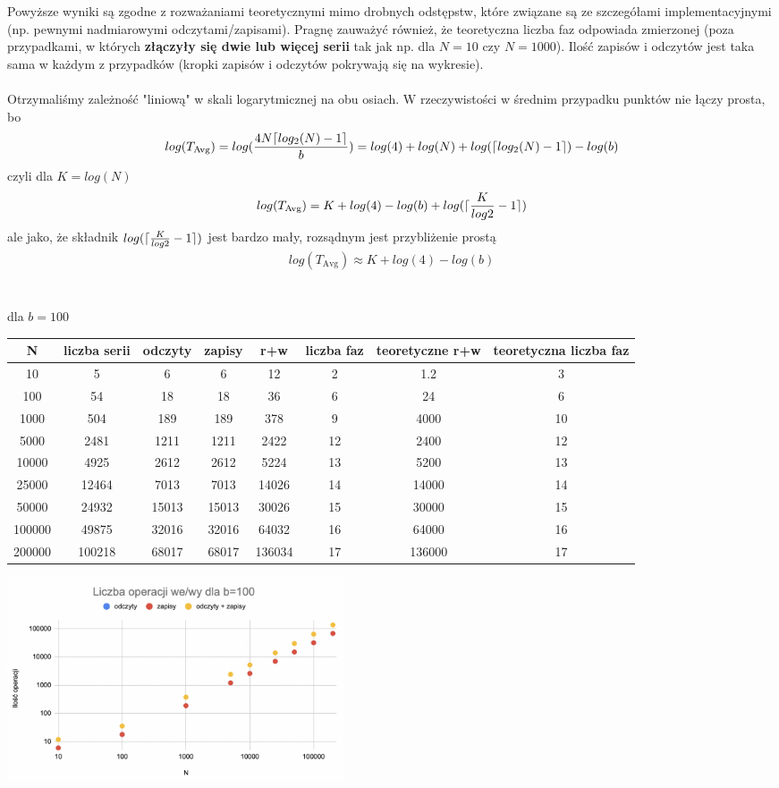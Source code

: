 \documentclass{article}
\DeclarePairedDelimiter\ceil{\lceil}{\rceil}
\begin{document}
Powyższe wyniki są zgodne z rozważaniami teoretycznymi mimo drobnych odstępstw, które
związane są ze szczegółami implementacyjnymi (np. pewnymi nadmiarowymi odczytami/zapisami).  Pragnę zauważyć również, że teoretyczna liczba faz odpowiada zmierzonej (poza przypadkami, w których \textbf{złączyły
się dwie lub więcej serii} tak jak np.  dla $N=10$ czy $N=1000$).   Ilość zapisów i odczytów jest taka sama w każdym z przypadków (kropki zapisów i odczytów pokrywają się na wykresie).
\\\\ Otrzymaliśmy zależność  "liniową" w skali 
logarytmicznej na obu osiach.  W rzeczywistości w średnim przypadku punktów nie łączy prosta,  bo 
\begin{gather*}
	log(T_{\text{Avg}}) = log(\frac{4N\ceil{log_2(N) - 1}}{b}) =  log(4) + log(N) + log(\ceil{log_2(N) - 1}) - log(b)
\end{gather*}
czyli dla $K = log(N)$
\begin{gather*}
	log(T_{\text{Avg}}) = K + log(4) - log(b) + log(\ceil{\frac{K}{log2} - 1})
\end{gather*} 
ale jako, że składnik $log(\ceil{\frac{K}{log2} - 1})$ jest bardzo mały, rozsądnym jest przybliżenie prostą
\begin{gather*}
	log(T_{\text{Avg}}) \approx K + log(4) - log(b)
\end{gather*}\\\\
dla $b=100$
\begin{center}
\begin{tabular}{ c c | c c c c | c c}
 N & liczba serii &odczyty & zapisy & r+w & liczba faz & teoretyczne r+w & teoretyczna liczba faz\\ 
\hline
 10 & 5 & 6 & 6 & 12 & 2 & 1.2 & 3\\  
 100 & 54 & 18 & 18 & 36 & 6 & 24 & 6 \\
 1000 & 504 & 189 & 189 & 378 & 9 & 4000 & 10\\
 5000 & 2481 & 1211 & 1211 & 2422 & 12 & 2400 & 12\\
 10000 & 4925 & 2612 & 2612 & 5224 & 13 & 5200 & 13 \\
 25000 & 12464 &  7013 & 7013 & 14026 & 14 & 14000 & 14 \\
 50000 & 24932 & 15013 & 15013 & 30026 & 15 & 30000 & 15\\
 100000 & 49875 & 32016 & 32016 & 64032 & 16 & 64000 & 16\\
 200000 & 100218 & 68017 & 68017 & 136034 & 17 & 136000 & 17\\
\end{tabular}
\includegraphics[width=10cm]{b100}
\end{center}
\end{document}
